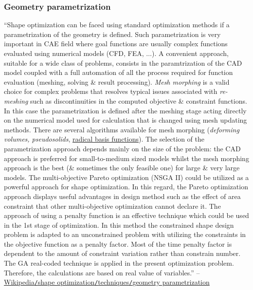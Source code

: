 \documentclass[oneside]{book}
\numberwithin{equation}{section}
\begin{document}
\subsubsection{Geometry parametrization}
``Shape optimization can be faced using standard optimization methods if a parametrization of the geometry is defined. Such parametrization is very important in CAE field where goal functions are usually complex functions evaluated using numerical models (CFD, FEA, $\ldots$). A convenient approach, suitable for a wide class of problems, consists in the paramtrization of the CAD model coupled with a full automation of all the process required for function evaluation (meshing, solving \& result processing). \textit{Mesh morphing} is a valid choice for complex problems that resolves typical issues associated with \textit{re-meshing} such as discontinuities in the computed objective \& constraint functions. In this case the parametrization is defined after the meshing stage acting directly on the numerical model used for calculation that is changed using mesh updating methods. There are several algorithms available for mesh morphing (\textit{deforming volumes, pseudosolids}, \href{https://en.wikipedia.org/wiki/Radial_basis_function}{radical basis functions}). The selection of the parametrization approach depends mainly on the size of the problem: the CAD approach is preferred for small-to-medium sized models whilst the mesh morphing approach is the best (\& sometimes the only feasible one) for large \& very large models. The multi-objective Pareto optimization (NSGA II) could be utilized as a powerful approach for shape optimization. In this regard, the Pareto optimization approach displays useful advantages in design method such as the effect of area constraint that other multi-objective optimization cannot declare it. The approach of using a penalty function is an effective technique which could be used in the 1st stage of optimization. In this method the constrained shape design problem is adapted to an unconstrained problem with utilizing the constraints in the objective function as a penalty factor. Most of the time penalty factor is dependent to the amount of constraint variation rather than constrain number. The GA real-coded technique is applied in the present optimization problem. Therefore, the calculations are based on real value of variables.'' -- \href{https://en.wikipedia.org/wiki/Shape_optimization#Geometry_parametrization}{Wikipedia\texttt{/}shape optimization\texttt{/}techniques\texttt{/}geometry parametrization}
\end{document}
